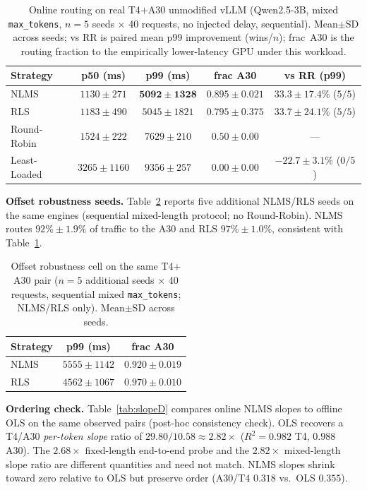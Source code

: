 \documentclass[pdflatex,sn-mathphys-num]{sn-jnl}
\begin{document}
\begin{table}[!t]
\centering
\caption{Online routing on real T4$+$A30 unmodified vLLM
(Qwen2.5-3B, mixed \texttt{max\_tokens}, $n{=}5$ seeds $\times$ 40 requests,
no injected delay, sequential). Mean$\pm$SD across seeds; vs RR is paired mean p99
improvement (wins/$n$); frac~A30 is the routing fraction to the empirically
lower-latency GPU under this workload.}
\label{tab:realD}
\footnotesize
\setlength{\tabcolsep}{3pt}
\begin{tabular}{@{}lcccc@{}}
\toprule
Strategy & p50 (ms) & p99 (ms) & frac A30 & vs RR (p99) \\
\midrule
NLMS & $1130\pm271$ & $\mathbf{5092\pm1328}$ & $\mathbf{0.895\pm0.021}$ & $\mathbf{33.3\pm17.4\%}$ ($5/5$) \\
RLS & $1183\pm490$ & $5045\pm1821$ & $0.795\pm0.375$ & $33.7\pm24.1\%$ ($5/5$) \\
Round-Robin & $1524\pm222$ & $7629\pm210$ & $0.50\pm0.00$ & --- \\
Least-Loaded & $3265\pm1160$ & $9356\pm257$ & $0.00\pm0.00$ & $-22.7\pm3.1\%$ ($0/5$) \\
\bottomrule
\end{tabular}
\end{table}

\textbf{Offset robustness seeds.}
Table~\ref{tab:realDextra} reports five additional NLMS/RLS seeds on the same engines
(sequential mixed-length protocol; no Round-Robin). NLMS routes $92\%\pm1.9\%$ of
traffic to the A30 and RLS $97\%\pm1.0\%$, consistent with Table~\ref{tab:realD}.

\begin{table}[!t]
\centering
\caption{Offset robustness cell on the same T4$+$A30 pair
($n{=}5$ additional seeds $\times$ 40 requests, sequential mixed \texttt{max\_tokens};
NLMS/RLS only). Mean$\pm$SD across seeds.}
\label{tab:realDextra}
\footnotesize
\begin{tabular}{@{}lcc@{}}
\toprule
Strategy & p99 (ms) & frac A30 \\
\midrule
NLMS & $5555\pm1142$ & $0.920\pm0.019$ \\
RLS & $4562\pm1067$ & $0.970\pm0.010$ \\
\bottomrule
\end{tabular}
\end{table}

\textbf{Ordering check.}
Table~\ref{tab:slopeD} compares online NLMS slopes to offline OLS on the same
observed pairs (post-hoc consistency check). OLS recovers a T4/A30
\emph{per-token slope} ratio of $29.80/10.58\approx 2.82\times$
($R^{2}{=}0.982$ T4, $0.988$ A30). The $2.68\times$ fixed-length end-to-end probe
and the $2.82\times$ mixed-length slope ratio are different quantities and need not
match. NLMS slopes shrink toward zero relative to OLS but preserve order
(A30/T4 $0.318$ vs.\ OLS $0.355$).
\end{document}

